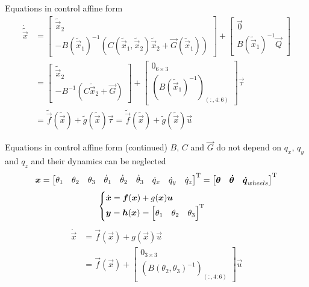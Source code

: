 \begin{frame}{Equations in control affine form}
  \[
  \begin{split}
    \dot{\tilde{\vec{x}}} &= 
    \begin{bmatrix}
      \tilde{\vec{x}}_2 \\
      - B({\tilde{\vec{x}}_1}) ^ {-1} (C(\tilde{\vec{x}}_1, \tilde{\vec{x}}_2) \tilde{\vec{x}}_2 + \vec{G}(\tilde{\vec{x}}_1)) 
    \end{bmatrix} +
    \begin{bmatrix}
      \vec{0} \\
      B({\tilde{\vec{x}}_1}) ^ {-1} \vec{Q}
    \end{bmatrix}\\
    &=\begin{bmatrix}
    \tilde{\vec{x}}_2 \\
    - B^ {-1} (C \tilde{\vec{x}}_2 + \vec{G}) 
    \end{bmatrix} +
    \begin{bmatrix}
      0_{6\times3} \\
      \left(B({\tilde{\vec{x}}_1}) ^ {-1}\right)_{(:, 4:6)}
    \end{bmatrix}\vec{\tau}\\
    &= \tilde{\vec{f}}(\tilde{\vec{x}}) + \tilde{g}(\tilde{\vec{x}}) \vec{\tau}
    = \tilde{\vec{f}}(\tilde{\vec{x}}) + \tilde{g}(\tilde{\vec{x}}) \vec{u}
  \end{split}
  \]
\end{frame}

\begin{frame}{Equations in control affine form (continued)}
  $B$, $C$ and $\vec{G}$ do \alert{not} depend on $q_x$, $q_y$ and $q_z$ and their dynamics can be neglected
  \[
  \boldsymbol{x} =
  \begin{bmatrix}
    \theta_1 & \theta_2 & \theta_3 & \dot{\theta}_1 & \dot{\theta}_2 & \dot{\theta}_3 & \dot{q}_x & \dot{q}_y & \dot{q}_z
  \end{bmatrix}^{\mathrm{T}} = \begin{bmatrix}
    \boldsymbol{\theta} & \boldsymbol{\dot{\theta}} & \boldsymbol{\dot{q}}_{wheels}
  \end{bmatrix}^{\mathrm{T}}
  \]
  \[
  \begin{cases}
    \dot{\boldsymbol{x}} = \boldsymbol{f}(\boldsymbol{x}) + g(\boldsymbol{x}) \boldsymbol{u} \\
    \boldsymbol{y} = \boldsymbol{h}(\boldsymbol{x}) =
    \begin{bmatrix}
      \theta_1 &
      \theta_2 &
      \theta_3
    \end{bmatrix} ^{\mathrm{T}}
  \end{cases}
  \]
  \[
  \begin{split}
    \dot{\vec{x}} &= \vec{f}(\vec{x}) + g(\vec{x})\vec{u}\\
    &=\vec{f}(\vec{x}) +
    \begin{bmatrix}
      0_{3\times3} \\
      \left(B(\theta_2,\theta_3) ^ {-1}\right)_{(:, 4:6)}
    \end{bmatrix}\vec{u}\\
  \end{split}
  \]
\end{frame}

